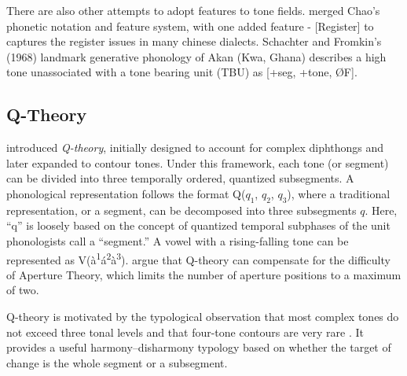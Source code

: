 There are also other attempts to adopt features to tone fields.
\cite{zhu1999shanghai} merged Chao's phonetic notation and feature
system, with one added feature - [Register] to captures the register
issues in many chinese dialects. Schachter and Fromkin’s (1968) landmark
generative phonology of Akan (Kwa, Ghana) describes a high tone
unassociated with a tone­ bearing unit (TBU) as [+seg, +tone, ØF]. 

\subsection{Q-Theory}

\citet{inkelas2013abc+} introduced \textit{Q-theory}, initially designed to account
for complex diphthongs and later expanded to contour tones. Under this
framework, each tone (or segment) can be divided into three temporally ordered,
quantized subsegments. A phonological representation follows the format
Q($q_1$, $q_2$, $q_3$), where a traditional representation, or a segment, can be
decomposed into three subsegments $q$. Here, ``q'' is loosely based on the concept
of quantized temporal subphases of the unit phonologists call a ``segment.''
A vowel with a rising-falling tone can be represented as
V(à\textsuperscript{1}á\textsuperscript{2}à\textsuperscript{3}).
\citet{inkelas2013abc+} argue that Q-theory can compensate for the difficulty of
Aperture Theory, which limits the number of aperture positions to a maximum of
two.

Q-theory is motivated by the typological observation that most complex tones do
not exceed three tonal levels and that four-tone contours are very rare
\citep{shih2013subsegmental}. It provides a useful harmony--disharmony typology
based on whether the target of change is the whole segment or a subsegment.



		
		
